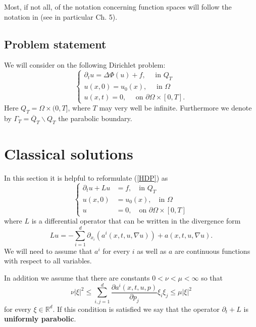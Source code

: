\documentclass[11pt, a4paper]{article}
\begin{document}
Most, if not all, of the notation concerning function spaces will follow the notation in \citep{evans} (see in particular Ch. 5). 
 
\subsection{Problem statement}
We will consider on the following Dirichlet problem:
\begin{equation}
\label{HDP}
	\begin{cases}
		\partial_t u = \Delta \Phi(u) + f, \quad \text{ in } Q_T \\
		u(x,0) = u_0(x), \quad \text{ in } \Omega \\
		u(x,t) = 0, \quad \text{ on } \partial\Omega \times [0,T].
	\end{cases}
\end{equation}
Here $Q_T = \Omega \times (0,T]$, where $T$ may very well be infinite. Furthermore we denote by $\Gamma_T = \overline{Q}_T\backslash Q_T$ the parabolic boundary.
\section{Classical solutions}
In this section it is helpful to reformulate (\ref{HDP}) as 
\begin{equation}
	\begin{cases}
		\partial_t u + Lu &= f, \quad \text{in } Q_T \\
		u(x,0) &= u_0(x), \quad \text{in } \Omega \\
		u &= 0, \quad \text{on } \partial \Omega \times [0,T]
	\end{cases}
\end{equation}
where $L$ is a differential operator that can be written in the divergence form
\begin{equation}
Lu = -\sum_{i=1}^d \partial_{x_i}(a^i(x,t,u,\nabla u)) + a(x,t,u,\nabla u).
\end{equation}
We will need to assume that $a^i$ for every $i$ as well as $a$ are continuous functions with respect to all variables.

In addition we assume that there are constants $0 < \nu < \mu < \infty $ so that
\begin{equation}
\label{uniform_parabolicity}
\nu |\xi|^2 \leq \sum_{i,j=1}^d \frac{\partial a^i(x,t,u,p)}{\partial p_j}\xi_i \xi_j \leq \mu |\xi|^2 
\end{equation}
for every $\xi \in \mathbb{R}^d$. If this condition is satisfied we say that the operator $\partial_t + L$ is \textbf{uniformly parabolic}.
\end{document}
